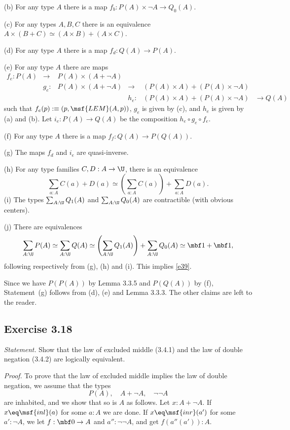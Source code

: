 \documentclass[12pt]{article}
\begin{document}
\nn(b) For any type $A$ there is a map $f_b:P(A)\times\neg A\to Q_0(A)$.

\nn(c) For any types $A,B,C$ there is an equivalence $A\times(B+C)\simeq(A\times B)+(A\times C)$.

\nn(d) For any type $A$ there is a map $f_d:Q(A)\to P(A)$.

\nn(e) For any type $A$ there are maps 
$$
\begin{matrix}
f_e:P(A)&\to &P(A)\times(A+\neg A)\\ 
        &g_e:&P(A)\times(A+\neg A)&\to &(P(A)\times A)+(P(A)\times\neg A)\\ 
        &    &                    &h_e:&(P(A)\times A)+(P(A)\times\neg A)&\to Q(A)
\end{matrix}
$$ 
such that $f_e(p):\equiv(p,\msf{LEM}(A,p))$, $g_e$ is given by (c), and $h_e$ is given by (a) and (b). Let $i_e:P(A)\to Q(A)$ be the composition $h_e\circ g_e\circ f_e$.

\nn(f) For any type $A$ there is a map $f_f:Q(A)\to P(Q(A))$.

\nn(g) The maps $f_d$ and $i_e$ are quasi-inverse.

\nn(h) For any type families $C,D:A\to\U$, there is an equivalence 
$$
\sum_{a:A}C(a)+D(a)\simeq\left(\sum_{a:A}C(a)\right)+\sum_{a:A}D(a).
$$
\nn(i) The types $\sum_{A:\U}Q_1(A)$ and $\sum_{A:\U}Q_0(A)$ are contractible (with obvious centers).

\nn(j) There are equivalences 
$$
\sum_{A:\U}P(A)\simeq\sum_{A:\U}Q(A)\simeq\left(\sum_{A:\U}Q_1(A)\right)+\sum_{A:\U}Q_0(A)\simeq\mbf1+\mbf1,
$$ 
following respectively from (g), (h) and (i). This implies \eqref{e39}.

Since we have $P(P(A))$ by Lemma 3.3.5 and $P(Q(A))$ by (f), Statement~(g) follows from (d), (e) and Lemma 3.3.3. The other claims are left to the reader.


\subsection{Exercise 3.18}

\emph{Statement.} Show that the law of excluded middle (3.4.1) and the law of double negation (3.4.2) are logically equivalent.

\nn\emph{Proof.} To prove that the law of excluded middle implies the law of double negation, we assume that the types 
$$
P(A),\quad A+\neg A,\quad \neg\neg A
$$ 
are inhabited, and we show that so is $A$ as follows. Let $x:A+\neg A$. If $x\eq\msf{inl}(a)$ for some $a:A$ we are done. If $x\eq\msf{inr}(a')$ for some $a':\neg A$, we let $f:\mbf0\to A$ and $a'':\neg\neg A$, and get $f(a''(a')):A$. 
\end{document}

